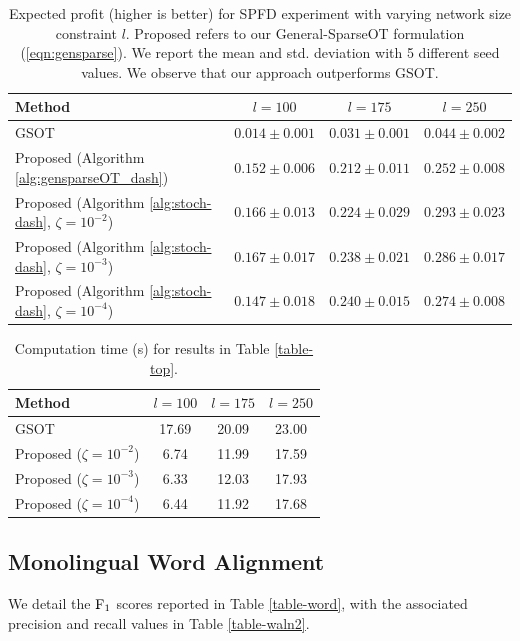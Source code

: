 \begin{table}[t]
\caption{Expected profit (higher is better) for SPFD experiment with varying network size constraint $l$. Proposed refers to our General-SparseOT formulation (\ref{eqn:gensparse}). We report the mean and std. deviation with 5 different seed values. We observe that our approach outperforms GSOT.}
\label{app-table-top}
\centering
\begin{tabular}{lccc}
\toprule
Method & $l=100$ & $l=175$ & $l=250$\\
\midrule
    GSOT \citep{ijcai2023p679} & $0.014 \pm 0.001$ & $0.031 \pm 0.001$ & $0.044 \pm 0.002$ \\
    \rowcolor{green!10}
    Proposed (Algorithm \ref{alg:gensparseOT_dash}) & $0.152 \pm 0.006$ & $0.212 \pm 0.011$ & $0.252\pm0.008$\\
    \rowcolor{green!10}
    Proposed (Algorithm \ref{alg:stoch-dash}, $\zeta= 10^{-2}$)  & $0.166 \pm 0.013$ & $ 0.224 \pm 0.029 $ & $ \mathbf{0.293\pm0.023}$\\
    \rowcolor{green!10}
    Proposed (Algorithm \ref{alg:stoch-dash}, $\zeta= 10^{-3}$) & $ \mathbf{0.167\pm0.017}$ & $ 0.238 \pm 0.021$ & $0.286 \pm 0.017$\\
    \rowcolor{green!10}
    Proposed (Algorithm \ref{alg:stoch-dash}, $\zeta= 10^{-4}$) & $0.147 \pm 0.018$ & $ \mathbf{0.240\pm0.015}$ & $ 0.274 \pm 0.008$\\
\bottomrule
\end{tabular}
\end{table}
 \begin{table}
\caption{Computation time (s) for results in Table \ref{table-top}.}
\label{table: Time T1}
\centering
\setlength{\tabcolsep}{4pt}
\begin{tabular}{lccc}
\toprule
Method & $l=100$ & $l=175$ & $l=250$\\
\midrule
    GSOT \citep{ijcai2023p679} & 17.69 & 20.09 & 23.00 \\
    Proposed ($\zeta= 10^{-2}$) & 6.74 & 11.99 & 17.59 \\
    Proposed ($\zeta= 10^{-3}$) & 6.33 & 12.03 & 17.93 \\
    Proposed ($\zeta= 10^{-4}$) & 6.44 & 11.92 & 17.68 \\
\bottomrule
\end{tabular}
\end{table}

\subsection{Monolingual Word Alignment}\label{app:word_alignment}
We detail the $\rm{F}_1$ scores reported in Table \ref{table-word}, with the associated precision and recall values in Table \ref{table-waln2}. 

